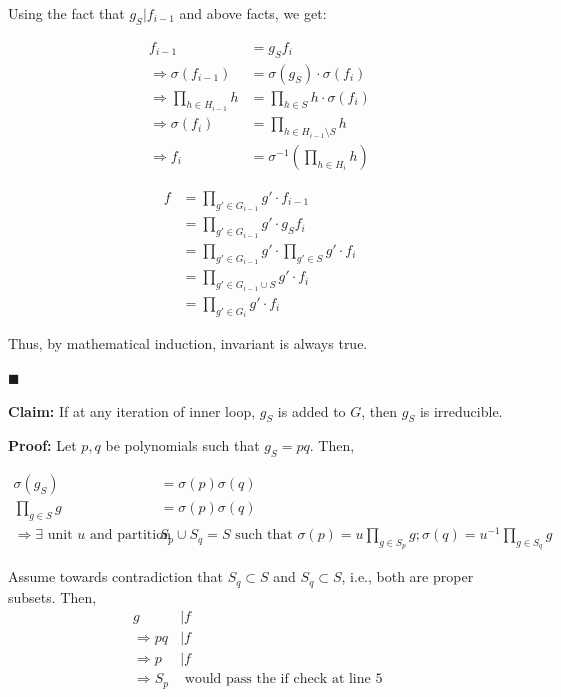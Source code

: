Using the fact that $g_S \vert f_{i-1}$ and above facts, we get:

\begin{align*}
    f_{i-1} &= g_S f_i \\
    \Rightarrow \sigma(f_{i-1}) &= \sigma(g_S) \cdot \sigma(f_i) \\
    \Rightarrow \prod_{h \in H_{i-1}} h &= \prod_{h \in S} h \cdot \sigma(f_i) \\
    \Rightarrow \sigma(f_i) &= \prod_{h \in H_{i-1} \setminus S} h \\
    \Rightarrow f_i &= \sigma^{-1}\left(\prod_{h \in H_i} h\right)
\end{align*}

\begin{align*}
    f &= \prod_{g' \in G_{i-1}} g' \cdot f_{i-1} \\
    &= \prod_{g' \in G_{i-1}} g' \cdot g_S f_i \\
    &= \prod_{g' \in G_{i-1}} g' \cdot \prod_{g' \in S} g' \cdot f_i \\
    &= \prod_{g' \in G_{i-1} \cup S} g' \cdot f_i \\
    &= \prod_{g' \in G_i} g' \cdot f_i
\end{align*}

Thus, by mathematical induction, invariant is always true.

\hfill$\blacksquare$

\textbf{Claim: } If at any iteration of inner loop, $g_S$ is added to $G$, then $g_S$ is irreducible.

\textbf{Proof: } Let $p, q$ be polynomials such that $g_S = pq$. Then,

\begin{align*}
    \sigma(g_S) &= \sigma(p)\sigma(q) \\
    \prod_{g \in S} g &= \sigma(p) \sigma(q)\\
    \Rightarrow \exists \text{ unit } u \text{ and partition } &S_p \cup S_q = S \text{ such that } \sigma(p) = u\prod_{g \in S_p} g; \sigma(q) = u^{-1}\prod_{g \in S_q} g
\end{align*}

Assume towards contradiction that $S_q \subset S$ and $S_q \subset S$, i.e., both are proper subsets. Then,
\begin{align*}
g &\vert f \\
\Rightarrow pq &\vert f \\
\Rightarrow p &\vert f \\
\Rightarrow S_p &\text{ would pass the if check at line 5 }
\end{align*}

